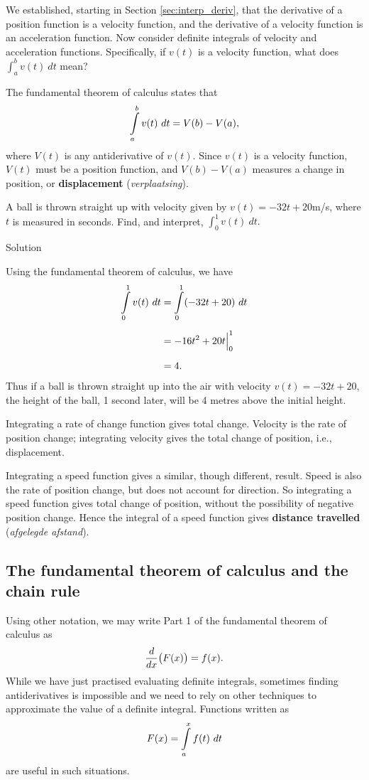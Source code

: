 We established, starting in Section \ref{sec:interp_deriv}, that the derivative of a position function is a velocity function, and the derivative of a velocity function is an acceleration function. Now consider definite integrals of velocity and acceleration functions. Specifically, if $v(t)$ is a velocity function, what does $ \int_a^b v(t)\ dt$ mean?

The fundamental theorem of calculus states that
$$\displaystyle \int\limits_a^b v(t)\ dt = V(b) - V(a),$$ 
where $V(t)$ is any antiderivative of $v(t)$. Since $v(t)$ is a velocity function, $V(t)$ must be a position function, and $V(b) - V(a)$ measures a change in position, or \textbf{displacement} (\textit{verplaatsing}).

\begin{example}\label{ex_ftcmotion1}
A ball is thrown straight up with velocity given by $v(t) = -32t+20$m/s, where $t$ is measured in seconds. Find, and interpret, $\int_0^1 v(t)\ dt.$

\ifanalysis\pagebreak\fi
{}Solution 

Using the fundamental theorem of calculus, we have 
\allowdisplaybreaks
\begin{align*}
\displaystyle \int\limits_0^1 v(t)\ dt &= \displaystyle \int\limits_0^1 (-32t+20)\ dt \\[0.2cm]
			&= -16t^2 + 20t\Big|_0^1 \\[0.2cm]
			&= 4.
\end{align*}
Thus if a ball is thrown straight up into the air with velocity $v(t) = -32t+20$, the height of the ball, 1 second later, will be 4 metres above the initial height. 
\end{example}


Integrating a rate of change function gives total change. Velocity is the rate of position change; integrating velocity gives the total change of position, i.e., displacement.

Integrating a speed function gives a similar, though different, result. Speed is also the rate of position change, but does not account for direction. So integrating a speed function gives total change of position, without the possibility of negative position change. Hence the integral of a speed function gives \textbf{distance travelled} (\textit{afgelegde afstand}).

\subsection{The fundamental theorem of calculus and the chain rule}
Using other notation, we may write Part 1 of the fundamental theorem of calculus as
$$\displaystyle \frac{d}{dx}\big(F(x)\big) = f(x).$$
While we have just practised evaluating definite integrals, sometimes finding antiderivatives is impossible and we need to rely on other techniques to approximate the value of a definite integral. Functions written as 
$$F(x) = \displaystyle \int\limits_a^x f(t)\ dt$$
 are useful in such situations.


